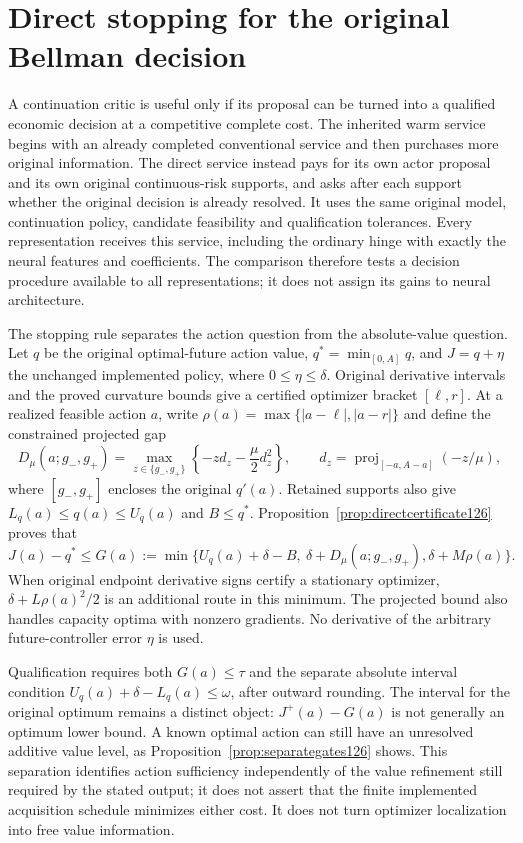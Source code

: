 \section{Direct stopping for the original Bellman decision}
\label{sec:decisionstopping126}

A continuation critic is useful only if its proposal can be turned into
a qualified economic decision at a competitive complete cost.  The
inherited warm service begins with an already completed conventional
service and then purchases more original information.  The direct
service instead pays for its own actor proposal and its own original
continuous-risk supports, and asks after each support whether the
original decision is already resolved.  It uses the same original
model, continuation policy, candidate feasibility and qualification
tolerances.  Every representation receives this service, including the
ordinary hinge with exactly the neural features and coefficients.
The comparison therefore tests a decision procedure available to all
representations; it does not assign its gains to neural architecture.

The stopping rule separates the action question from the absolute-value
question.  Let $q$ be the original optimal-future action value,
$q^*=\min_{[0,A]}q$, and $J=q+\eta$ the unchanged implemented policy,
where $0\le\eta\le\delta$.  Original derivative intervals and the
proved curvature bounds give a certified optimizer bracket $[\ell,r]$.
At a realized feasible action $a$, write
$\rho(a)=\max\{|a-\ell|,|a-r|\}$ and define the constrained projected
gap
\[
 D_\mu(a;g_-,g_+)=
 \max_{z\in\{g_-,g_+\}}
 \left\{-z d_z-\frac\mu2d_z^2\right\},\qquad
 d_z=\operatorname{proj}_{[-a,A-a]}(-z/\mu),
\]
where $[g_-,g_+]$ encloses the original $q'(a)$.  Retained supports
also give $L_q(a)\le q(a)\le U_q(a)$ and $B\le q^*$.
Proposition~\ref{prop:directcertificate126} proves that
\[
 J(a)-q^*\le G(a):=
 \min\{U_q(a)+\delta-B,\ \delta+D_\mu(a;g_-,g_+),
                              \delta+M\rho(a)\}.
\]
When original endpoint derivative signs certify a stationary optimizer,
$\delta+L\rho(a)^2/2$ is an additional route in this minimum.  The
projected bound also handles capacity optima with nonzero gradients.
No derivative of the arbitrary future-controller error $\eta$ is used.

Qualification requires both $G(a)\le\tau$ and the separate absolute
interval condition $U_q(a)+\delta-L_q(a)\le\omega$, after outward
rounding.  The interval for the original optimum remains a distinct
object: $J^+(a)-G(a)$ is not generally an optimum lower bound.  A
known optimal action can still have an unresolved additive value level,
as Proposition~\ref{prop:separategates126} shows.  This separation identifies action sufficiency independently of the
value refinement still required by the stated output; it does not assert
that the finite implemented acquisition schedule minimizes either cost.  It does not turn optimizer localization into free value
information.

